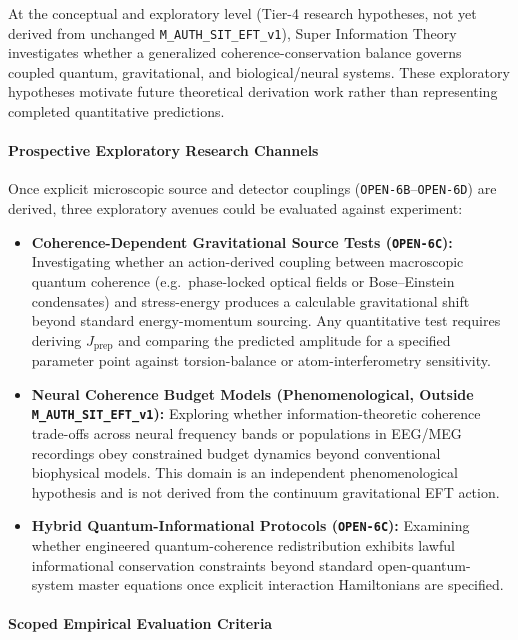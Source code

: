 At the conceptual and exploratory level (Tier-4 research hypotheses, not yet derived from unchanged \texttt{M\_AUTH\_SIT\_EFT\_v1}), Super Information Theory investigates whether a generalized coherence-conservation balance governs coupled quantum, gravitational, and biological/neural systems. These exploratory hypotheses motivate future theoretical derivation work rather than representing completed quantitative predictions.

\paragraph{Prospective Exploratory Research Channels}

Once explicit microscopic source and detector couplings (\texttt{OPEN-6B}--\texttt{OPEN-6D}) are derived, three exploratory avenues could be evaluated against experiment:

\begin{itemize}
    \item \textbf{Coherence-Dependent Gravitational Source Tests (\texttt{OPEN-6C}):} Investigating whether an action-derived coupling between macroscopic quantum coherence (e.g.\ phase-locked optical fields or Bose--Einstein condensates) and stress-energy produces a calculable gravitational shift beyond standard energy-momentum sourcing. Any quantitative test requires deriving $J_{\mathrm{prep}}$ and comparing the predicted amplitude for a specified parameter point against torsion-balance or atom-interferometry sensitivity.
    \item \textbf{Neural Coherence Budget Models (Phenomenological, Outside \texttt{M\_AUTH\_SIT\_EFT\_v1}):} Exploring whether information-theoretic coherence trade-offs across neural frequency bands or populations in EEG/MEG recordings obey constrained budget dynamics beyond conventional biophysical models. This domain is an independent phenomenological hypothesis and is not derived from the continuum gravitational EFT action.
    \item \textbf{Hybrid Quantum-Informational Protocols (\texttt{OPEN-6C}):} Examining whether engineered quantum-coherence redistribution exhibits lawful informational conservation constraints beyond standard open-quantum-system master equations once explicit interaction Hamiltonians are specified.
\end{itemize}

\paragraph{Scoped Empirical Evaluation Criteria}

